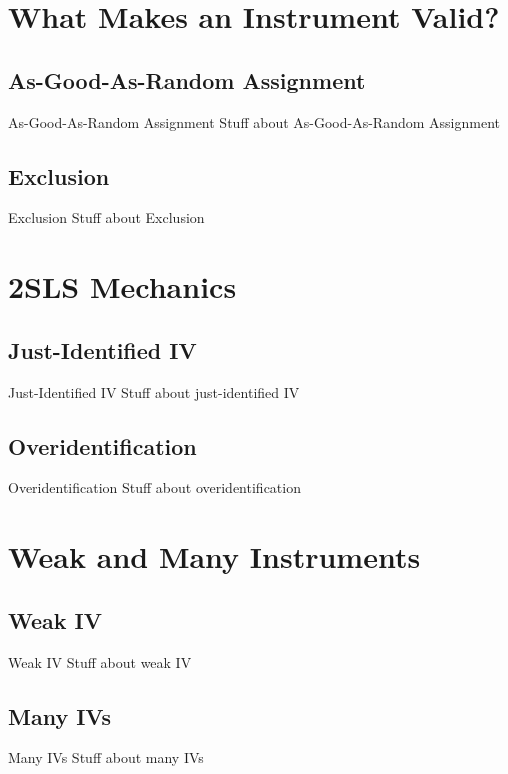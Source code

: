 \documentclass{beamer}
\begin{document}

\section{What Makes an Instrument Valid?}

\subsection{As-Good-As-Random Assignment}
\begin{frame}{As-Good-As-Random Assignment}
Stuff about As-Good-As-Random Assignment
\end{frame}

\subsection{Exclusion}
\begin{frame}{Exclusion}
Stuff about Exclusion
\end{frame}

\section{2SLS Mechanics}

\subsection{Just-Identified IV}
\begin{frame}{Just-Identified IV}
Stuff about just-identified IV
\end{frame}

\subsection{Overidentification}
\begin{frame}{Overidentification}
Stuff about overidentification
\end{frame}

\section{Weak and Many Instruments}

\subsection{Weak IV}
\begin{frame}{Weak IV}
Stuff about weak IV
\end{frame}

\subsection{Many IVs}
\begin{frame}{Many IVs}
Stuff about many IVs
\end{frame}
\end{document}
